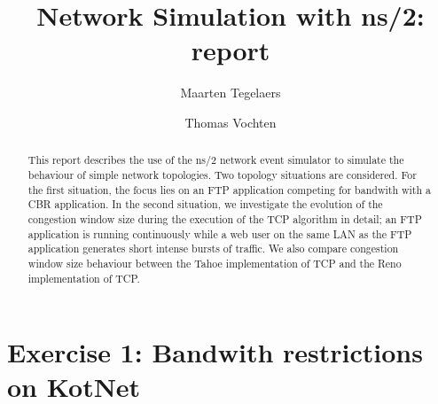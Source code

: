 \documentclass[a4paper,10pt]{article}
\title{Network Simulation with ns/2: report}
\author{Maarten Tegelaers \and Thomas Vochten}
\begin{document}
\maketitle

\begin{abstract}
This report describes the use of the ns/2 network event simulator to simulate the behaviour of simple network topologies.
Two topology situations are considered. For the first situation, the focus lies on an FTP application competing for bandwith
with a CBR application. In the second situation, we investigate the evolution of the congestion window size during the
execution of the TCP algorithm in detail; an FTP application is running continuously while a web user on the same LAN as
the FTP application generates short intense bursts of traffic. We also compare congestion window size behaviour between
the Tahoe implementation of TCP and the Reno implementation of TCP.
\end{abstract}

\section{Exercise 1: Bandwith restrictions on KotNet}
\end{document}
